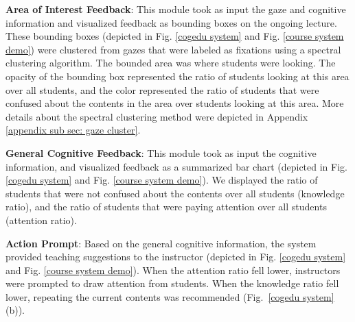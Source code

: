 \textbf{Area of Interest Feedback}: This module took as input the gaze and cognitive information and visualized feedback as bounding boxes on the ongoing lecture. These bounding boxes (depicted in Fig. \ref{cogedu system} and Fig. \ref{course system demo}) were clustered from gazes that were labeled as fixations using a spectral clustering algorithm. The bounded area was where students were looking. The opacity of the bounding box represented the ratio of students looking at this area over all students, and the color represented the ratio of students that were confused about the contents in the area over students looking at this area. More details about the spectral clustering method were depicted in Appendix \ref{appendix sub sec: gaze cluster}.


\textbf{General Cognitive Feedback}: This module took as input the cognitive information, and visualized feedback as a summarized bar chart (depicted in Fig. \ref{cogedu system} and Fig. \ref{course system demo}). We displayed the ratio of students that were not confused about the contents over all students (knowledge ratio), and the ratio of students that were paying attention over all students (attention ratio). 

\textbf{Action Prompt}: Based on the general cognitive information, the system provided teaching suggestions to the instructor (depicted in Fig. \ref{cogedu system} and Fig. \ref{course system demo}). When the attention ratio fell lower, instructors were prompted to draw attention from students. When the knowledge ratio fell lower, repeating the current contents was recommended (Fig.~\ref{cogedu system}(b)).










